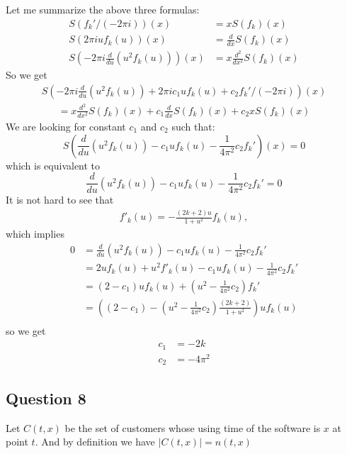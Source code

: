 \documentclass[pdf]{article}
\begin{document}
Let me summarize the above three formulas:
\begin{align*}
S(f_k'/(-2\pi i))(x) &= xS(f_k)(x)\\
S(2\pi iuf_k(u))(x) &= \frac{d}{dx} S(f_k)(x)\\
S(-2\pi i\frac{d}{du}(u^2f_k(u)))(x) &= x\frac{d^2}{dx^2} S(f_k)(x)
\end{align*}
So we get
\begin{align*}
S\left(-2\pi i\frac{d}{du}(u^2f_k(u)) + 2\pi ic_1uf_k(u) + c_2f_k'/(-2\pi i)\right)(x)
\end{align*}
\begin{align*}
= x\frac{d^2}{dx^2} S(f_k)(x) + c_1\frac{d}{dx} S(f_k)(x) + c_2xS(f_k)(x)
\end{align*}
We are looking for constant $c_1$ and $c_2$ such that:
$$S\left(\frac{d}{du}(u^2f_k(u)) - c_1uf_k(u) - \frac{1}{4\pi^2}c_2f_k'\right)(x) = 0$$
which is equivalent to
$$\frac{d}{du}(u^2f_k(u)) - c_1uf_k(u) - \frac{1}{4\pi^2}c_2f_k' = 0$$
It is not hard to see that
\begin{align*}
f'_k(u) = -\frac{(2k+2)u}{1+u^2}f_k(u),
\end{align*}
which implies
\begin{align*}
0 &= \frac{d}{du}(u^2f_k(u)) - c_1uf_k(u) - \frac{1}{4\pi^2}c_2f_k' \\
                                                                                                       &= 2uf_k(u) + u^2f'_k(u) - c_1uf_k(u) - \frac{1}{4\pi^2}c_2f_k'\\
                                                                                                       &= (2 - c_1)uf_k(u) + (u^2 - \frac{1}{4\pi^2}c_2)f_k'\\
                                                                                                       &= \left( (2 - c_1) - (u^2 - \frac{1}{4\pi^2}c_2)\frac{(2k+2)}{1+u^2}\right)uf_k(u)\\
\end{align*}
so we get
\begin{align*}
c_1 &= -2k\\
c_2 &= -4\pi^2
\end{align*}

\newpage
\subsection{Question 8}
Let $C(t,x)$ be the set of customers whose using time of the software is $x$ at point $t$. And by definition we have $|C(t,x)| = n(t,x)$\\
\end{document}
